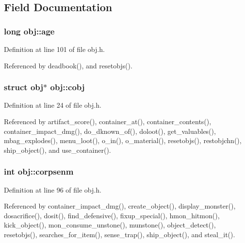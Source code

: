 \subsection{Field Documentation}
\hypertarget{structobj_a3dd6f7cf99f6a946d0ca406cfca5c23d}{
\subsubsection[{age}]{\setlength{\rightskip}{0pt plus 5cm}long obj\+::age}}\label{structobj_a3dd6f7cf99f6a946d0ca406cfca5c23d}


Definition at line 101 of file obj.\+h.



Referenced by deadbook(), and resetobjs().

\hypertarget{structobj_aa7bed832c417657c964b6f5893737586}{
\subsubsection[{cobj}]{\setlength{\rightskip}{0pt plus 5cm}struct {\bf obj}$\ast$ obj\+::cobj}}\label{structobj_aa7bed832c417657c964b6f5893737586}


Definition at line 24 of file obj.\+h.



Referenced by artifact\+\_\+score(), container\+\_\+at(), container\+\_\+contents(), container\+\_\+impact\+\_\+dmg(), do\+\_\+dknown\+\_\+of(), doloot(), get\+\_\+valuables(), mbag\+\_\+explodes(), menu\+\_\+loot(), o\+\_\+in(), o\+\_\+material(), resetobjs(), restobjchn(), ship\+\_\+object(), and use\+\_\+container().

\hypertarget{structobj_ad5db7220e2b815d06c3c80027ab9924f}{
\subsubsection[{corpsenm}]{\setlength{\rightskip}{0pt plus 5cm}int obj\+::corpsenm}}\label{structobj_ad5db7220e2b815d06c3c80027ab9924f}


Definition at line 96 of file obj.\+h.



Referenced by container\+\_\+impact\+\_\+dmg(), create\+\_\+object(), display\+\_\+monster(), dosacrifice(), dosit(), find\+\_\+defensive(), fixup\+\_\+special(), hmon\+\_\+hitmon(), kick\+\_\+object(), mon\+\_\+consume\+\_\+unstone(), munstone(), object\+\_\+detect(), resetobjs(), searches\+\_\+for\+\_\+item(), sense\+\_\+trap(), ship\+\_\+object(), and steal\+\_\+it().

